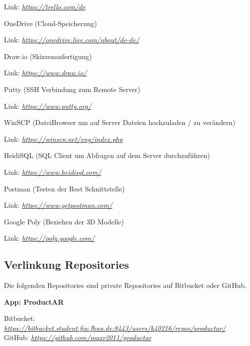 \documentclass{scrartcl}
\begin{document}
\noindent Link: \textit{\url{https://trello.com/de} \newline}

\noindent OneDrive (Cloud-Speicherung)

\noindent Link: \textit{\url{https://onedrive.live.com/about/de-de/} \newline}

\noindent Draw.io (Skizzenanfertigung)

\noindent Link: \textit{\url{https://www.draw.io/} \newline}

\noindent Putty (SSH Verbindung zum Remote Server)

\noindent Link: \textit{\url{https://www.putty.org/} \newline}

\noindent WinSCP (DateiBrowser um auf Server Dateien hochzuladen / zu verändern)

\noindent Link: \textit{\url{https://winscp.net/eng/index.php} \newline}

\noindent HeidiSQL (SQL Client um Abfragen auf dem Server durchzuführen) 

\noindent Link: \textit{\url{https://www.heidisql.com/} \newline}

\noindent Postman (Testen der Rest Schnittstelle)

\noindent Link: \textit{\url{https://www.getpostman.com/} \newline}

\noindent Google Poly (Beziehen der 3D Modelle) 

\noindent Link: \textit{\url{https://poly.google.com/} \newline}



\newpage

\subsection{Verlinkung Repositories}

Die folgenden Repositories sind private Repositories auf Bitbucket oder GitHub. \newline

\noindent \textbf{App: ProductAR}

\noindent Bitbucket: \textit{\url{https://bitbucket.student.fiw.fhws.de:8443/users/k40216/repos/productar/} \newline}
\noindent GitHub: \textit{\url{https://github.com/maxr2011/productar} \newline }
\end{document}
